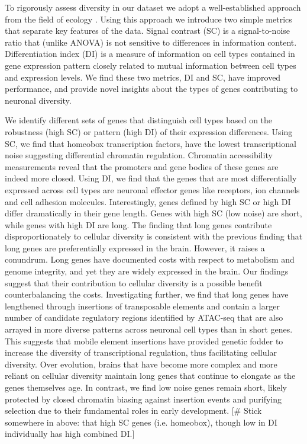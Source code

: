 To rigorously assess diversity in our dataset we adopt a well-established approach from the field of ecology \cite{Simpson_1949}. Using this approach we introduce two simple metrics that separate key features of the data. Signal contrast (SC) is a signal-to-noise ratio that (unlike ANOVA) is not sensitive to differences in information content. Differentiation index (DI) is a measure of information on cell types contained in gene expression pattern closely related to mutual information between cell types and expression levels. We find these two metrics, DI and SC, have improved performance, and provide novel insights about the types of genes contributing to neuronal diversity.

We identify different sets of genes that distinguish cell types based on the robustness (high SC) or pattern (high DI) of their expression differences. Using SC, we find that homeobox transcription factors, have the lowest transcriptional noise suggesting differential chromatin regulation. Chromatin accessibility measurements reveal that the promoters and gene bodies of these genes are indeed more closed. Using DI, we find that the genes that are most differentially expressed across cell types are neuronal effector genes like receptors, ion channels and cell adhesion molecules. Interestingly, genes defined by high SC or high DI differ dramatically in their gene length. Genes with high SC (low noise) are short, while genes with high DI are long. The finding that long genes contribute disproportionately to cellular diversity is consistent with the previous finding that long genes are preferentially expressed in the brain. However, it raises a conundrum. Long genes have documented costs with respect to metabolism and genome integrity, and yet they are widely expressed in the brain. Our findings suggest that their contribution to cellular diversity is a possible benefit counterbalancing the costs. Investigating further, we find that long genes have lengthened through insertions of transposable elements and contain a larger number of candidate regulatory regions identified by ATAC-seq that are also arrayed in more diverse patterns across neuronal cell types than in short genes. This suggests that mobile element insertions have provided genetic fodder to increase the diversity of transcriptional regulation, thus facilitating cellular diversity. Over evolution, brains that have become more complex and more reliant on cellular diversity maintain long genes that continue to elongate as the genes themselves age. In contrast, we find low noise genes remain short, likely protected by closed chromatin biasing against insertion events and purifying selection due to their fundamental roles in early development.
[# Stick somewhere in above: that high SC genes (i.e. homeobox), though low in DI individually has high combined DI.]

